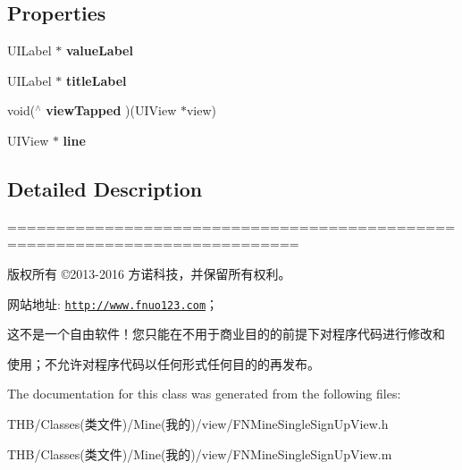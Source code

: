 \subsection*{Properties}
\begin{DoxyCompactItemize}
\item 
\mbox{\label{interface_f_n_mine_single_sign_up_view_a7e2a03d71f39cc40cdb88bdb1cdb3656}} 
U\+I\+Label $\ast$ {\bfseries value\+Label}
\item 
\mbox{\label{interface_f_n_mine_single_sign_up_view_a3335bebb9db8998c32350c76410c3490}} 
U\+I\+Label $\ast$ {\bfseries title\+Label}
\item 
\mbox{\label{interface_f_n_mine_single_sign_up_view_a73b869a073272ec996f37ea398c2ce82}} 
void($^\wedge$ {\bfseries view\+Tapped} )(U\+I\+View $\ast$view)
\item 
\mbox{\label{interface_f_n_mine_single_sign_up_view_a71affaebc5897f26a190354d8c559779}} 
U\+I\+View $\ast$ {\bfseries line}
\end{DoxyCompactItemize}


\subsection{Detailed Description}
============================================================================

版权所有 ©2013-\/2016 方诺科技，并保留所有权利。

网站地址\+: \href{http://www.fnuo123.com}{\tt http\+://www.\+fnuo123.\+com}； 



这不是一个自由软件！您只能在不用于商业目的的前提下对程序代码进行修改和

使用；不允许对程序代码以任何形式任何目的的再发布。 

 

The documentation for this class was generated from the following files\+:\begin{DoxyCompactItemize}
\item 
T\+H\+B/\+Classes(类文件)/\+Mine(我的)/view/F\+N\+Mine\+Single\+Sign\+Up\+View.\+h\item 
T\+H\+B/\+Classes(类文件)/\+Mine(我的)/view/F\+N\+Mine\+Single\+Sign\+Up\+View.\+m\end{DoxyCompactItemize}
